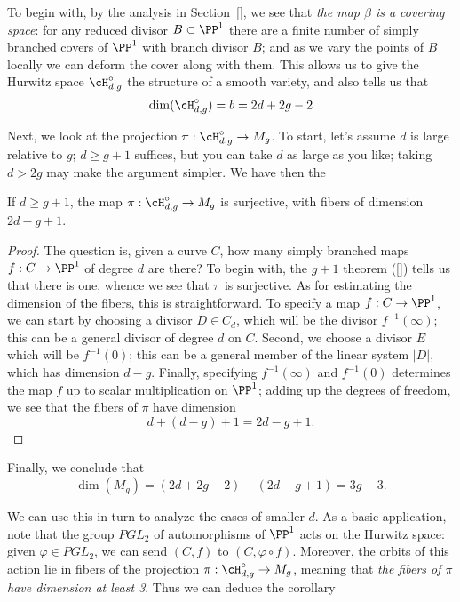 To begin with, by the analysis in Section~\ref{}, we see that \emph{the map $\beta$ is a covering space}: for any reduced divisor $B \subset \PP^1$ there are a finite number of simply branched covers of $\PP^1$ with branch divisor $B$; and as we vary the points of $B$ locally we can deform the cover along with them. This allows us to give the Hurwitz space $\cH^\circ_{d,g}$ the structure of a smooth variety, and also tells us that
$$
\dim(\cH^\circ_{d,g}) = b = 2d+2g-2
$$

Next, we look at the projection $\pi : \cH^\circ_{d,g} \to M_g$. To start, let's assume $d$ is large relative to $g$; $d \geq g+1$ suffices, but you can take $d$ as large as you like; taking $d > 2g$ may make the argument simpler. We have then the

\begin{proposition}
If $d \geq g+1$, the map $\pi : \cH^\circ_{d,g} \to M_g$ is surjective, with fibers of dimension $2d-g+1$.
\end{proposition}

\begin{proof}
The question is, given a curve $C$, how many simply branched maps $f : C \to \PP^1$ of degree $d$ are there? To begin with, the $g+1$ theorem (\ref{}) tells us that there is one, whence we see that $\pi$ is surjective. As for estimating the dimension of the fibers, this is straightforward. To specify a map $f : C \to \PP^1$, we can start by choosing a divisor $D \in C_d$, which will be the divisor $f^{-1}(\infty)$; this can be a general divisor of degree $d$ on $C$. Second, we choose a divisor $E$ which will be $f^{-1}(0)$; this can be a general member of the linear system $|D|$, which has dimension $d-g$. Finally, specifying $f^{-1}(\infty)$ and $f^{-1}(0)$ determines the map $f$ up to scalar multiplication on $\PP^1$; adding up the degrees of freedom, we see that the fibers of $\pi$ have dimension
$$
d + (d-g) + 1 = 2d-g+1.
$$ 
\end{proof}

Finally, we conclude that
$$
\dim(M_g) = (2d+2g-2) - (2d - g + 1) = 3g-3.
$$

We can use this in turn to analyze the cases of smaller $d$. As a basic application, note that the group $PGL_2$ of automorphisms of $\PP^1$ acts on the Hurwitz space: given $\varphi \in PGL_2$, we can send $(C,f)$ to $(C, \varphi \circ f)$. Moreover, the orbits of this action lie in fibers of the projection $\pi : \cH^\circ_{d,g} \to M_g$, meaning that \emph{the fibers of $\pi$ have dimension at least 3}. Thus we can deduce the corollary

